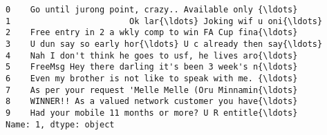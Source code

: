 \documentclass[11pt]{article}
\begin{document}
    \begin{Verbatim}[commandchars=\\\{\}]
0    Go until jurong point, crazy.. Available only {\ldots}
1                        Ok lar{\ldots} Joking wif u oni{\ldots}
2    Free entry in 2 a wkly comp to win FA Cup fina{\ldots}
3    U dun say so early hor{\ldots} U c already then say{\ldots}
4    Nah I don't think he goes to usf, he lives aro{\ldots}
5    FreeMsg Hey there darling it's been 3 week's n{\ldots}
6    Even my brother is not like to speak with me. {\ldots}
7    As per your request 'Melle Melle (Oru Minnamin{\ldots}
8    WINNER!! As a valued network customer you have{\ldots}
9    Had your mobile 11 months or more? U R entitle{\ldots}
Name: 1, dtype: object

    \end{Verbatim}
\end{document}
